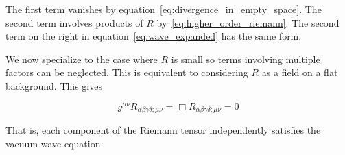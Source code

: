 The first term vanishes by equation~\ref{eq:divergence_in_empty_space}.  The second term involves
products of $R$ by~\ref{eq:higher_order_riemann}.  The second term on the
right in equation~\ref{eq:wave_expanded} has the same form.

We now specialize to the case where $R$ is small so terms
involving multiple factors can be neglected.  This is equivalent to
considering $R$ as a field on a flat background.  This gives

\begin{equation}
\label{eq:riemann_wave}
g^{\mu\nu}
R_{\alpha\beta\gamma\delta;\mu\nu}
=
\Box R_{\alpha\beta\gamma\delta;\mu\nu}
= 0
\end{equation}

That is, each component of the Riemann tensor independently 
satisfies the vacuum wave equation.



